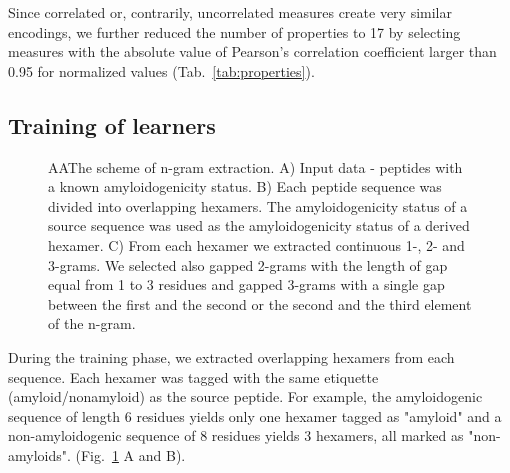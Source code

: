 \documentclass[a4,center,fleqn]{NAR}
\begin{document}
  Since correlated or, contrarily, uncorrelated measures create very similar 
%
%
%
encodings, we further reduced the number of properties to 17 by selecting 
%
%
%
measures with the absolute value of Pearson's correlation coefficient larger 
than 0.95 for normalized values (Tab.~\ref{tab:properties}).

\subsection{Training of learners}

\begin{figure}[!tpb]
\centering
    
  \caption{AAThe scheme of n-gram extraction. A) Input data - peptides with a 
known amyloidogenicity status. B) Each peptide sequence was divided into 
overlapping hexamers. The amyloidogenicity status of a source sequence was used 
as the amyloidogenicity status of a derived hexamer. C) From each hexamer we 
extracted continuous 1-, 2- and 3-grams. We selected also gapped 2-grams with 
the length of gap equal from 1 to 3 residues and gapped 3-grams with a single 
gap between the first and the second or the second and the third element of the 
n-gram.}
\label{fig:ngram_scheme}
\end{figure}

  During the training phase, we extracted overlapping hexamers from each sequence. 
%
%
%
Each hexamer was tagged with the same etiquette (amyloid/nonamyloid) as the 
source peptide. For example, the amyloidogenic sequence of length 6 residues 
yields only one 
%
%
%
%
%
%
%
%
%
hexamer tagged as "amyloid" and a non-amyloidogenic sequence of 8 residues yields 
3 hexamers, all marked as "non-amyloids". (Fig.~\ref{fig:ngram_scheme} A and B). 
\end{document}

